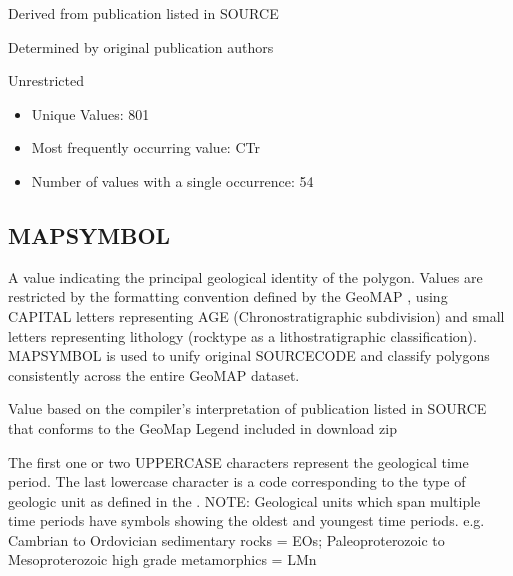 \documentclass[letterpaper,10pt,english]{sphinxmanual}
\begin{document}
Derived from publication listed in SOURCE

Determined by original publication authors


Unrestricted

\begin{itemize}
\item {} 
Unique Values: 801

\item {} 
Most frequently occurring value: C\sphinxhyphen{}Tr

\item {} 
Number of values with a single occurrence: 54

\end{itemize}


\subsection{MAPSYMBOL}
\label{\detokenize{field_glossary:mapsymbol}}
A value indicating the principal geological identity of the polygon. Values are restricted by the formatting convention defined by the GeoMAP {\hyperref[\detokenize{legend::doc}]{}}, using CAPITAL letters representing AGE (Chronostratigraphic subdivision) and small letters representing lithology (rock\sphinxhyphen{}type as a lithostratigraphic classification). MAPSYMBOL is used to unify original SOURCECODE and classify polygons consistently across the entire GeoMAP dataset.

Value based on the compiler’s interpretation of publication listed in SOURCE that conforms to the GeoMap Legend included in download zip

The first one or two UPPERCASE characters represent the geological time period. The last lowercase character is a code corresponding to the type of geologic unit as defined in the {\hyperref[\detokenize{legend::doc}]{}}. NOTE: Geological units which span multiple time periods have symbols showing the oldest and youngest time periods. e.g. Cambrian to Ordovician sedimentary rocks = EOs; Paleoproterozoic to Mesoproterozoic high grade metamorphics = LMn
\end{document}
